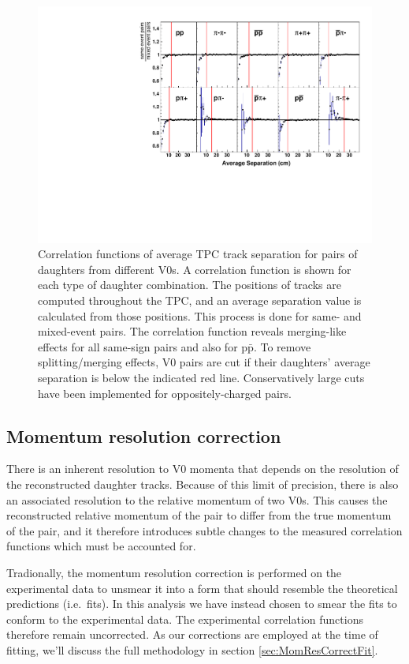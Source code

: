 \begin{figure}[hbt]
\includegraphics[width=36pc]{Figures/Cuts/2016-9-4-AllAvgSepCFs.pdf}
\caption[Average separation of V0 daughters]{
Correlation functions of average TPC track separation for pairs of daughters from different V0s. A correlation function is shown for each type of daughter combination. The positions of tracks are computed throughout the TPC, and an average separation value is calculated from those positions. This process is done for same- and mixed-event pairs. The correlation function reveals merging-like effects for all same-sign pairs and also for p$\bar{\mathrm{p}}$. To remove splitting/merging effects, V0 pairs are cut if  their daughters' average separation is below the indicated red line. Conservatively large cuts have been implemented for oppositely-charged pairs.}
\label{fig:AverageSeparationAllPairs}
\end{figure}

\subsection{Momentum resolution correction}
\label{sec:MomentumResCorrectionCF}

There is an inherent resolution to V0 momenta that depends on the resolution of the reconstructed daughter tracks.  
Because of this limit of precision, there is also an associated resolution to the relative momentum of two V0s.
This causes the reconstructed relative momentum of the pair to differ from the true momentum of the pair, and it therefore introduces subtle changes to the measured correlation functions which must be accounted for.

Tradionally, the momentum resolution correction is performed on the experimental data to unsmear it into a form that should resemble the theoretical predictions (i.e.\ fits). 
In this analysis we have instead chosen to smear the fits to conform to the experimental data. 
The experimental correlation functions therefore remain uncorrected. 
As our corrections are employed at the time of fitting, we'll discuss the full methodology in section \ref{sec:MomResCorrectFit}.